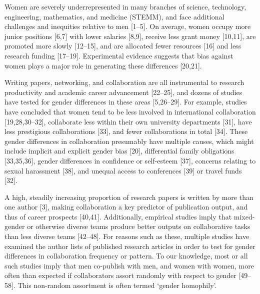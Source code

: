 \documentclass[12pt,]{article}
\begin{document}
Women are severely underrepresented in many branches of science,
technology, engineering, mathematics, and medicine (STEMM), and face
additional challenges and inequities relative to men {[}1--5{]}. On
average, women occupy more junior positions {[}6,7{]} with lower
salaries {[}8,9{]}, receive less grant money {[}10,11{]}, are promoted
more slowly {[}12--15{]}, and are allocated fewer resources {[}16{]} and
less research funding {[}17--19{]}. Experimental evidence suggests that
bias against women plays a major role in generating these differences
{[}20,21{]}.

Writing papers, networking, and collaboration are all instrumental to
research productivity and academic career advancement {[}22--25{]}, and
dozens of studies have tested for gender differences in these areas
{[}5,26--29{]}. For example, studies have concluded that women tend to
be less involved in international collaboration {[}19,28,30--32{]},
collaborate less within their own university departments {[}31{]}, have
less prestigious collaborations {[}33{]}, and fewer collaborations in
total {[}34{]}. These gender differences in collaboration presumably
have multiple causes, which might include implicit and explicit gender
bias {[}20{]}, differential family obligations {[}33,35,36{]}, gender
differences in confidence or self-esteem {[}37{]}, concerns relating to
sexual harassment {[}38{]}, and unequal access to conferences {[}39{]}
or travel funds {[}32{]}.

A high, steadily increasing proportion of research papers is written by
more than one author {[}3{]}, making collaboration a key predictor of
publication output, and thus of career prospects {[}40,41{]}.
Additionally, empirical studies imply that mixed-gender or otherwise
diverse teams produce better outputs on collaborative tasks than less
diverse teams {[}42--48{]}. For reasons such as these, multiple studies
have examined the author lists of published research articles in order
to test for gender differences in collaboration frequency or pattern. To
our knowledge, most or all such studies imply that men co-publish with
men, and women with women, more often than expected if collaborators
assort randomly with respect to gender {[}49--58{]}. This non-random
assortment is often termed `gender homophily'.
\end{document}
